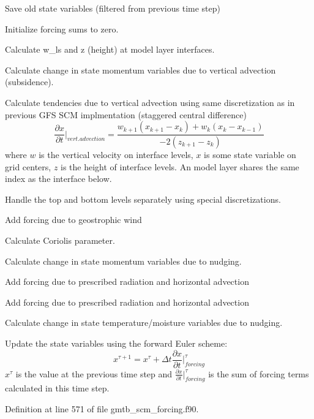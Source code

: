 \begin{DoxyItemize}
\item Save old state variables (filtered from previous time step)
\item Initialize forcing sums to zero.
\begin{DoxyItemize}
\item Calculate w\+\_\+ls and z (height) at model layer interfaces.
\end{DoxyItemize}
\item Calculate change in state momentum variables due to vertical advection (subsidence).
\begin{DoxyItemize}
\item Calculate tendencies due to vertical advection using same discretization as in previous G\+FS S\+CM implmentation (staggered central difference) \[ \frac{\partial x}{\partial t}|_{vert. advection} = \frac{w_{k+1}\left(x_{k+1} - x_{k}\right) + w_k\left(x_k - x_{k-1}\right)}{-2\left(z_{k+1}-z_{k}\right)} \] where $w$ is the vertical velocity on interface levels, $x$ is some state variable on grid centers, $z$ is the height of interface levels. An model layer shares the same index as the interface below.
\item Handle the top and bottom levels separately using special discretizations.
\end{DoxyItemize}
\item Add forcing due to geostrophic wind
\begin{DoxyItemize}
\item Calculate Coriolis parameter.
\end{DoxyItemize}
\item Calculate change in state momentum variables due to nudging.
\item Add forcing due to prescribed radiation and horizontal advection
\item Add forcing due to prescribed radiation and horizontal advection
\item Calculate change in state temperature/moisture variables due to nudging.
\item Update the state variables using the forward Euler scheme\+: \[ x^{\tau + 1} = x^{\tau} + \Delta t\frac{\partial x}{\partial t}|^\tau_{forcing} \] $x^{\tau}$ is the value at the previous time step and $\frac{\partial x}{\partial t}|^\tau_{forcing}$ is the sum of forcing terms calculated in this time step.
\end{DoxyItemize}

Definition at line 571 of file gmtb\+\_\+scm\+\_\+forcing.\+f90.



